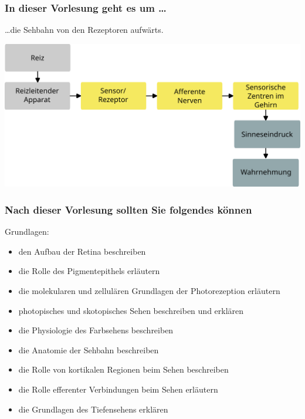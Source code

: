 \documentclass{beamer}
\begin{document}
 
\begin{frame}

 \frametitle{In dieser Vorlesung geht es um \dots}

\dots die Sehbahn von den Rezeptoren aufwärts.

\begin{center}
    \includegraphics[width=\textwidth]{wahrnehmungsprozess_ohne_beispiel_ab_sensor.png}
\end{center}



\end{frame}


 
\begin{frame}

 \frametitle{Nach dieser Vorlesung sollten Sie folgendes können}



\begin{block}{Grundlagen:}




\begin{itemize}

    \item 
den Aufbau der Retina beschreiben
    \item 
die Rolle des Pigmentepithels erläutern
    \item 
die molekularen und zellulären Grundlagen der Photorezeption erläutern
    \item 
photopisches und skotopisches Sehen beschreiben und erklären
    \item 
die Physiologie des Farbsehens beschreiben
    \item 
die Anatomie der Sehbahn beschreiben
    \item 
die Rolle von kortikalen Regionen beim Sehen beschreiben
    \item 
die Rolle efferenter Verbindungen beim Sehen erläutern
    \item 
die Grundlagen des Tiefensehens erklären
\end{itemize}


\end{block}

\end{frame}
\end{document}
